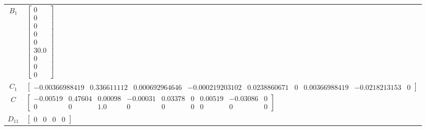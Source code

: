 \begin{tabular}{cl}
 $B_{1}$  & $\left[\begin{matrix}0\\0\\0\\0\\0\\30.0\\0\\0\\0\end{matrix}\right]$                                                                                                                                                                                                                                                                                                                                                                                                                                                                             \\
 $C_{1}$  & $\left[\begin{matrix}-0.00366988419 & 0.336611112 & 0.000692964646 & -0.000219203102 & 0.0238860671 & 0 & 0.00366988419 & -0.0218213153 & 0\end{matrix}\right]$                                                                                                                                                                                                                                                                                                                                                                                   \\
   $C$    & $\left[\begin{matrix}-0.00519 & 0.47604 & 0.00098 & -0.00031 & 0.03378 & 0 & 0.00519 & -0.03086 & 0\\0 & 0 & 1.0 & 0 & 0 & 0 & 0 & 0 & 0\end{matrix}\right]$                                                                                                                                                                                                                                                                                                                                                                                      \\
 $D_{11}$ & $\left[\begin{matrix}0 & 0 & 0 & 0\end{matrix}\right]$                                                                                                                                                                                                                                                                                                                                                                                                                                                                                            \\

\end{tabular}
